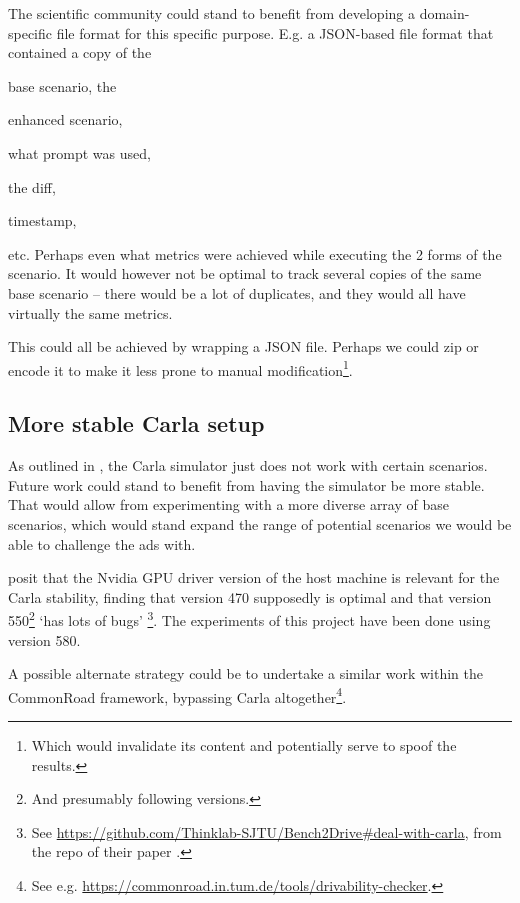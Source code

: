 The scientific community could stand to benefit from developing a
domain-specific file format for this specific purpose.
E.g. a JSON-based file format that contained a copy of the \begin{inparaenum}
    \item base scenario, the
    \item enhanced scenario,
    \item what prompt was used,
    \item the diff,
    \item timestamp,
\end{inparaenum} etc. Perhaps even what metrics were achieved while executing the 2 forms of the
scenario. It would however not be optimal to track several copies of the same base scenario -- there
would be a lot of duplicates, and they would all have virtually the same metrics.

This could all be achieved by wrapping a JSON file. Perhaps we could zip or encode it to make it
less prone to manual modification\footnote{Which would invalidate its content and potentially serve
    to spoof the results.}.

\subsection{More stable Carla setup}

As outlined in , the Carla simulator just does not work with certain scenarios.
Future work could stand to benefit from having the simulator be more stable. That would allow from
experimenting with a more diverse array of base scenarios, which would stand expand the range of
potential scenarios we would be able to challenge the \acrshort{ads} with.

\citeauthor{jia2024bench} posit that the Nvidia GPU driver version of the host machine is relevant
for the Carla stability, finding that version \num{470} supposedly is optimal and that version
\num{550}\footnote{And presumably following versions.} `has lots of bugs'
\footnote{\raggedright See
    \url{https://github.com/Thinklab-SJTU/Bench2Drive\#deal-with-carla},
    from the repo of their paper \cite{jia2024bench}.}.
The experiments of this project have been done using version \num{580}.

A possible alternate strategy could be to undertake a similar work within the CommonRoad framework,
bypassing Carla altogether\footnote{See e.g. \url{https://commonroad.in.tum.de/tools/drivability-checker}.}.


